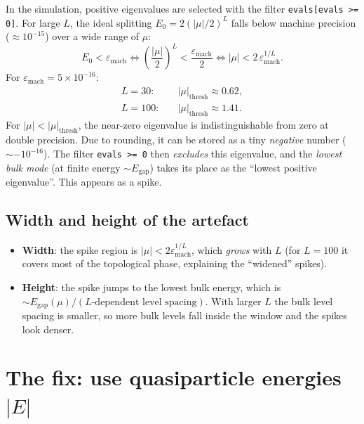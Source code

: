 \documentclass[11pt]{article}
\begin{document}
In the simulation, positive eigenvalues are selected with the filter
\texttt{evals[evals >= 0]}.  For large $L$, the ideal splitting
$E_0 = 2(|\mu|/2)^L$ falls below machine precision ($\approx 10^{-15}$)
over a wide range of $\mu$:
\begin{equation}
  E_0 < \varepsilon_\text{mach} \iff
  \left(\frac{|\mu|}{2}\right)^L < \frac{\varepsilon_\text{mach}}{2}
  \iff
  |\mu| < 2\,\varepsilon_\text{mach}^{1/L}.
\end{equation}
For $\varepsilon_\text{mach} = 5\times10^{-16}$:
\begin{align}
  L = 30:  &\quad |\mu|_\text{thresh} \approx 0.62, \\
  L = 100: &\quad |\mu|_\text{thresh} \approx 1.41.
\end{align}
For $|\mu| < |\mu|_\text{thresh}$, the near-zero eigenvalue is
indistinguishable from zero at double precision. Due to rounding,
it can be stored as a tiny \emph{negative} number ($\sim -10^{-16}$).
The filter \texttt{evals >= 0} then \emph{excludes} this eigenvalue,
and the \emph{lowest bulk mode} (at finite energy $\sim E_\text{gap}$)
takes its place as the ``lowest positive eigenvalue''. This appears
as a spike.

\subsection{Width and height of the artefact}

\begin{itemize}
  \item \textbf{Width}: the spike region is $|\mu| < 2\varepsilon_\text{mach}^{1/L}$,
    which \emph{grows} with $L$ (for $L=100$ it covers most of the
    topological phase, explaining the ``widened'' spikes).
  \item \textbf{Height}: the spike jumps to the lowest bulk energy,
    which is $\sim E_\text{gap}(\mu) / (L\text{-dependent level spacing})$.
    With larger $L$ the bulk level spacing is smaller, so more bulk
    levels fall inside the window and the spikes look denser.
\end{itemize}

\section{The fix: use quasiparticle energies $|E|$}
\end{document}
